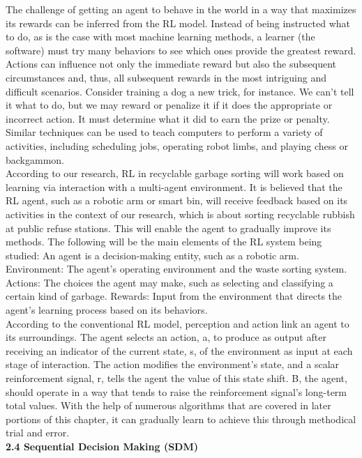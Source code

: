 \documentclass[a4paper,11pt,onecolumn]{article}
\begin{document}
The challenge of getting an agent to behave in the world in a way that maximizes its rewards can be inferred from the RL model. Instead of being instructed what to do, as is the case with most machine learning methods, a learner (the software) must try many behaviors to see which ones provide the greatest reward.  Actions can influence not only the immediate reward but also the subsequent circumstances and, thus, all subsequent rewards in the most intriguing and difficult scenarios. Consider training a dog a new trick, for instance. We can't tell it what to do, but we may reward or penalize it if it does the appropriate or incorrect action. It must determine what it did to earn the prize or penalty. Similar techniques can be used to teach computers to perform a variety of activities, including scheduling jobs, operating robot limbs, and playing chess or backgammon.\\
According to our research, RL in recyclable garbage sorting will work based on learning via interaction with a multi-agent environment. It is believed that the RL agent, such as a robotic arm or smart bin, will receive feedback based on its activities in the context of our research, which is about sorting recyclable rubbish at public refuse stations. This will enable the agent to gradually improve its methods. The following will be the main elements of the RL system being studied: An agent is a decision-making entity, such as a robotic arm. Environment: The agent's operating environment and the waste sorting system. Actions: The choices the agent may make, such as selecting and classifying a certain kind of garbage. Rewards: Input from the environment that directs the agent's learning process based on its behaviors.\\
According to the conventional RL model, perception and action link an agent to its surroundings. The agent selects an action, a, to produce as output after receiving an indicator of the current state, s, of the environment as input at each stage of interaction. The action modifies the environment's state, and a scalar reinforcement signal, r, tells the agent the value of this state shift. B, the agent, should operate in a way that tends to raise the reinforcement signal's long-term total values. With the help of numerous algorithms that are covered in later portions of this chapter, it can gradually learn to achieve this through methodical trial and error.\newline \\
\textbf{2.4 Sequential Decision Making (SDM)}\\ 
\end{document}
